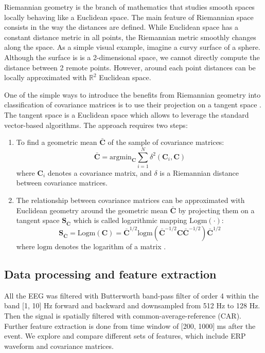 \documentclass[12pt]{iopart}
\begin{document}
Riemannian geometry is the branch of mathematics that studies
smooth spaces locally behaving like a Euclidean space.
The main feature of Riemannian space consists in the way the distances are defined.
While Euclidean space has a constant distance metric in all points,
the Riemannian metric smoothly changes along the space.
As a simple visual example, imagine a curvy surface of a sphere.
Although the surface is is a 2-dimensional space,
we cannot directly compute the distance between 2 remote points.
However, around each point distances can be locally approximated
with $\mathbb{R}^2$ Euclidean space.

One of the simple ways to introduce the benefits from Riemannian geometry
into classification of covariance matrices is to use their projection
on a tangent space \cite{barachant_multiclass_2012}. The tangent space is a Euclidean space which allows
to leverage the standard vector-based algorithms.
The approach requires two steps:
\begin{enumerate}
    \item To find a geometric mean $\bar{\mathbf{C}}$ of the sample of covariance matrices:
        \begin{equation}
            \bar{\mathbf{C}} = \textrm{argmin}_\mathbf{C} \sum_{i=1}^N \delta^2 (\mathbf{C}_i, \mathbf{C})
            \label{eq:geommean}
        \end{equation}
        where $\mathbf{C}_i$ denotes a covariance matrix, and $\delta$ is a 
        Riemannian distance between covariance matrices.
    \item The relationship between covariance matrices can be approximated with
        Euclidean geometry around the geometric mean $\bar{\mathbf{C}}$ by projecting them on a tangent
        space $\mathbf{S}_{\bar{\mathbf{C}}}$ which is called logarithmic mapping $\mathrm{Logm}(\cdot)$:
        \begin{equation}
            \mathbf{S}_{\bar{\mathbf{C}}} = \mathrm{Logm}( \mathbf{C}) = \bar{\mathbf{C}}^{1/2}
            \textrm{logm}(\bar{\mathbf{C}}^{-1/2}\mathbf{C}\bar{\mathbf{C}}^{-1/2})\bar{\mathbf{C}}^{1/2}
            \label{eq:logm}
        \end{equation}
        where $\textrm{logm}$ denotes the logarithm of a matrix \cite{berger_panoramic_2003}.
\end{enumerate}

\subsection{Data processing and feature extraction}
All the EEG was filtered with Butterworth band-pass filter of order 4 within the band [1, 10] Hz
forward and backward and downsampled from 512 Hz to 128 Hz. Then the signal is spatially
filtered with common-average-reference (CAR). Further feature extraction is done
from time window of [200, 1000] ms after the event. We explore and compare different sets
of features, which include ERP waveform and covariance matrices.
\end{document}

